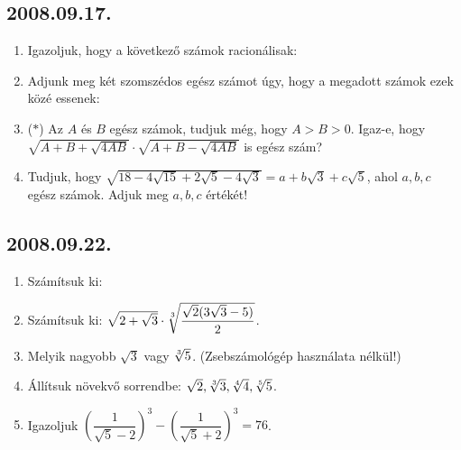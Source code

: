 \subsection*{2008.09.17.}
\begin{enumerate}
\item  Igazoljuk, hogy a következő számok racionálisak:

\item Adjunk meg két szomszédos egész számot úgy, hogy a megadott számok ezek közé essenek:
\item ($*$) Az $A$ és $B$ egész számok, tudjuk még, hogy $A>B>0$. Igaz-e, hogy $\sqrt{A+B+\sqrt{4AB}}\cdot\sqrt{A+B-\sqrt{4AB}}$ is egész szám?
\item Tudjuk, hogy $\sqrt{18-4\sqrt{15}+2\sqrt{5}-4\sqrt{3}}=a+b\sqrt{3}+c\sqrt{5}$, ahol $a,b,c$ egész számok. Adjuk meg $a,b,c$ értékét!

\end{enumerate}

\subsection*{2008.09.22.}
\begin{enumerate}
\item Számítsuk ki:
\item Számítsuk ki: $\sqrt{2+\sqrt{3}}\cdot \root3\of{\dfrac{\sqrt{2}(3\sqrt{3}-5)}{2}}$.
\item Melyik nagyobb $\sqrt{3}$ vagy $\root3\of{5}$. (Zsebszámológép használata nélkül!)
\item Állítsuk növekvő sorrendbe: $\sqrt{2},\root3\of{3},\root4\of{4},\root5\of{5}$.
\item Igazoljuk $\left(\dfrac{1}{\sqrt{5}-2}\right)^3-\left(\dfrac{1}{\sqrt{5}+2}\right)^3=76$.
\end{enumerate}

